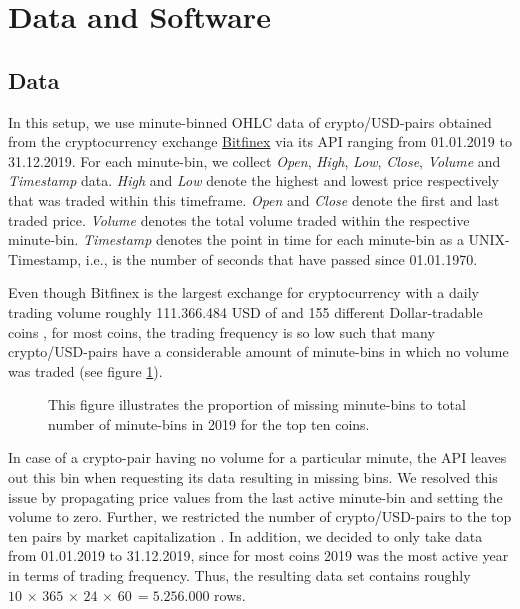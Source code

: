 \section{Data and Software}

\subsection{Data}
In this setup, we use minute-binned OHLC data of crypto/USD-pairs obtained from the cryptocurrency 
exchange \href{ https://www.bitfinex.com/ }{Bitfinex} via its API ranging from 01.01.2019 to 31.12.2019.
For each minute-bin, we collect \textit{Open}, \textit{High}, \textit{Low}, \textit{Close}, \textit{Volume} 
and \textit{Timestamp} data. 
\textit{High} and \textit{Low} denote the highest and lowest price respectively
that was traded within this timeframe. 
\textit{Open} and \textit{Close} denote the first and last traded price.
\textit{Volume} denotes the total volume traded within the respective minute-bin.
\textit{Timestamp} denotes the point in time for each minute-bin as a UNIX-Timestamp,
i.e., is the number of seconds that have passed since 01.01.1970.

Even though Bitfinex is the largest exchange for cryptocurrency 
with a daily trading volume roughly 111.366.484 USD of and
155 different Dollar-tradable coins \cite{bitfinex2012},
for most coins, the trading frequency is so low such that 
many crypto/USD-pairs have a considerable amount of minute-bins in 
which no volume was traded (see figure \ref{fig:all_missing_bins_total}).

\begin{figure}[H] 
    \captionsetup{format=plain}
    \caption{
        This figure illustrates the proportion of missing minute-bins
        to total number of minute-bins in 2019 for the top ten coins.
    }
    \label{fig:all_missing_bins_total}
\end{figure}


In case of a crypto-pair having no volume for a particular minute, the API leaves out this bin
when requesting its data resulting in missing bins. 
We resolved this issue by propagating price values from the last active minute-bin
and setting the volume to zero. Further, we restricted the number of crypto/USD-pairs to the
top ten pairs by market capitalization \cite{coinmarketcap2013}. 
In addition, we decided to only take data from 01.01.2019 to 31.12.2019, 
since for most coins 2019 was the most active year in terms of trading frequency.
Thus, the resulting data set contains roughly
$ 10\, \times\, 365\, \times\, 24\, \times\, 60\, = 5.256.000 $ rows.



